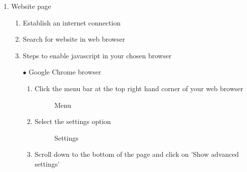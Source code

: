 \documentclass[14pt, a4paper]{article}
\begin{document}
\begin{enumerate}
  \item Website page
  \begin{enumerate}
  \item Establish an internet connection
  \item Search for website in web browser
 \item Steps to enable javascript in your chosen browser
    
  \item[$\bullet$] Google Chrome browser
    \begin{enumerate}
       \item Click the menu bar at the top right hand corner of your web browser
       \begin{figure}[H]
       \centerline{}
		\caption{Menu}
      \end{figure}
       \item Select the settings option
       \begin{figure}[H]
         \centerline{}
		\caption{Settings}
      \end{figure}
       \item Scroll down to the bottom of the page and click on 'Show advanced settings'
       \begin{figure}[H]
         \centerline{}

\end{figure}
\end{enumerate}
\end{enumerate}
\end{enumerate}
\end{document}
